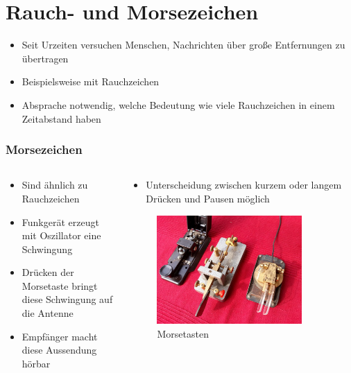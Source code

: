 
\section{Rauch- und Morsezeichen}
\label{section:rauch_und_morsezeichen}
\begin{frame}%
\begin{itemize}
  \item Seit Urzeiten versuchen Menschen, Nachrichten über große Entfernungen zu übertragen
  \item Beispielsweise mit Rauchzeichen
  \item Absprache notwendig, welche Bedeutung wie viele Rauchzeichen in einem Zeitabstand haben
  \end{itemize}

\end{frame}

\begin{frame}
\frametitle{Morsezeichen}
\begin{columns}
    \begin{column}{0.48\textwidth}
    \begin{itemize}
  \item Sind ähnlich zu Rauchzeichen
  \item Funkgerät erzeugt mit Oszillator eine Schwingung
  \item Drücken der Morsetaste bringt diese Schwingung auf die Antenne
  \item Empfänger macht diese Aussendung hörbar
  \end{itemize}

    \end{column}
   \begin{column}{0.48\textwidth}
       \begin{itemize}
  \item Unterscheidung zwischen kurzem oder langem Drücken und Pausen möglich
  \end{itemize}

\begin{figure}
    \includegraphics[width=0.85\textwidth]{foto/109}
    \caption{\scriptsize Morsetasten}
    \label{n_cwtast}
\end{figure}

   \end{column}
\end{columns}

\end{frame}

